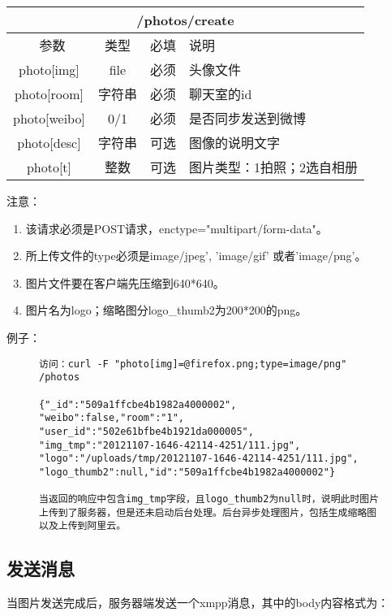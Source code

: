 \documentclass[cs4size]{ctexartutf8}
\begin{document}
\begin{table}[H]
   \begin{center}
\begin{tabular}{|c|c|c|p{12cm}|}
\hline
\multicolumn{4}{|c|}{/photos/create} \\
\hline\hline
 \  参数  & 类型 & 必填 &  说明  \\
\hline
 photo[img]  & file & 必须 &  头像文件\\
 \hline
 photo[room]  & 字符串 & 必须  &  聊天室的id\\
 \hline
 photo[weibo]  & 0/1 & 必须  &  是否同步发送到微博\\
   \hline
 photo[desc]  & 字符串 & 可选  &  图像的说明文字\\
 \hline
  photo[t]  & 整数 & 可选 &  图片类型：1拍照；2选自相册\\
 \hline
\end{tabular}
   \end{center}
\end{table}

注意：

\begin{enumerate}
\item 该请求必须是POST请求，enctype="multipart/form-data"。
\item 所上传文件的type必须是image/jpeg', 'image/gif' 或者'image/png'。
\item 图片文件要在客户端先压缩到640*640。
\item 图片名为logo；缩略图分logo\_thumb2为200*200的png。
\end{enumerate}

例子：

\begin{figure}[H]
\begin{verbatim}
访问：curl -F "photo[img]=@firefox.png;type=image/png" 
/photos

{"_id":"509a1ffcbe4b1982a4000002",
"weibo":false,"room":"1",
"user_id":"502e61bfbe4b1921da000005",
"img_tmp":"20121107-1646-42114-4251/111.jpg",
"logo":"/uploads/tmp/20121107-1646-42114-4251/111.jpg",
"logo_thumb2":null,"id":"509a1ffcbe4b1982a4000002"}

当返回的响应中包含img_tmp字段，且logo_thumb2为null时，说明此时图片上传到了服务器，但是还未启动后台处理。后台异步处理图片，包括生成缩略图以及上传到阿里云。

\end{verbatim}
\end{figure}


\subsection{发送消息}
当图片发送完成后，服务器端发送一个xmpp消息，其中的body内容格式为：
\end{document}
